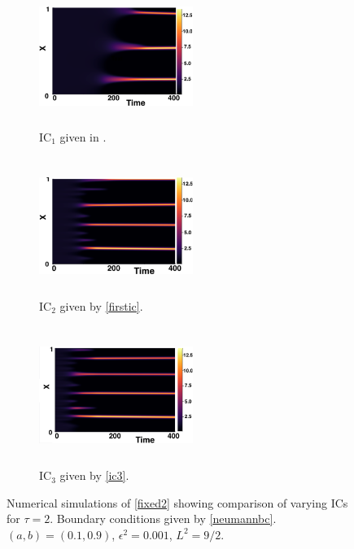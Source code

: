 \begin{figure}[H]
    \centering
    \begin{subfigure}[b]{0.32\textwidth}
        \centering
        \includegraphics[width=5cm,height=4.5cm]{gaff2.png}
        \caption{$\text{IC}_1$ given in \cite{gaffmonk}.}
        \label{}
    \end{subfigure}
    \hfill
    \begin{subfigure}[b]{0.32\textwidth}
        \centering
        \includegraphics[width=5cm,height=4.5cm]{ic22.png}
        \caption{$\text{IC}_2$ given by \eqref{firstic}.}
        \label{}
    \end{subfigure}
    \hfill
    \begin{subfigure}[b]{0.32\textwidth}
        \centering
        \includegraphics[width=5cm,height=4.5cm]{ic32.png}
        \caption{$\text{IC}_3$ given by \eqref{ic3}.}
        \label{}
    \end{subfigure}
    \caption{Numerical simulations of \eqref{fixed2} showing comparison of varying ICs for $\tau=2$. Boundary conditions given by \eqref{neumannbc}. $(a,b)=(0.1,0.9)$, $\epsilon^2=0.001$, $L^2=9/2$.}
    \label{fig:figtau2}
\end{figure}
